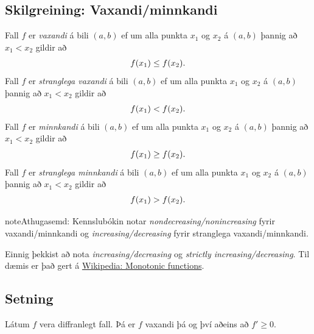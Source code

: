 \documentclass[b5paper,10pt,icelandic]{sphinxmanual}
\begin{document}
\subsection{Skilgreining: Vaxandi/minnkandi}
\label{kafli03:skilgreining-vaxandi-minnkandi}\label{kafli03:index-9}
Fall \(f\) er \emph{vaxandi} á bili \((a,b)\) ef um
alla punkta \(x_1\) og \(x_2\) á \((a,b)\) þannig að
\(x_1 < x_2\) gildir að
\begin{gather}
\begin{split}f(x_1) \leq f(x_2).\end{split}\notag
\end{gather}
Fall \(f\) er \emph{stranglega vaxandi} á bili \((a,b)\)
ef um alla punkta \(x_1\) og \(x_2\) á \((a,b)\) þannig að
\(x_1 < x_2\) gildir að
\begin{gather}
\begin{split}f(x_1) < f(x_2).\end{split}\notag
\end{gather}
Fall \(f\) er \emph{minnkandi} á bili \((a,b)\) ef um
alla punkta \(x_1\) og \(x_2\) á \((a,b)\) þannig að
\(x_1 < x_2\) gildir að
\begin{gather}
\begin{split}f(x_1) \geq f(x_2).\end{split}\notag
\end{gather}
Fall \(f\) er \emph{stranglega minnkandi} á bili
\((a,b)\) ef um alla punkta \(x_1\) og \(x_2\) á
\((a,b)\) þannig að \(x_1 < x_2\) gildir að
\begin{gather}
\begin{split}f(x_1) > f(x_2).\end{split}\notag
\end{gather}
\begin{notice}{note}{Athugasemd:}
Kennslubókin notar \emph{nondecreasing/nonincreasing} fyrir vaxandi/minnkandi og
\emph{increasing/decreasing} fyrir stranglega vaxandi/minnkandi.

Einnig þekkist að nota \emph{increasing/decreasing} og \emph{strictly increasing/decreasing}.
Til dæmis er það gert á \href{https://en.wikipedia.org/wiki/Monotonic\_function}{Wikipedia: Monotonic functions}.
\end{notice}


\subsection{Setning}
\label{kafli03:id15}\label{kafli03:vaxandieoae}
Látum \(f\) vera diffranlegt fall. Þá er \(f\) vaxandi þá og því
aðeins að \(f' \geq 0\).
\end{document}
